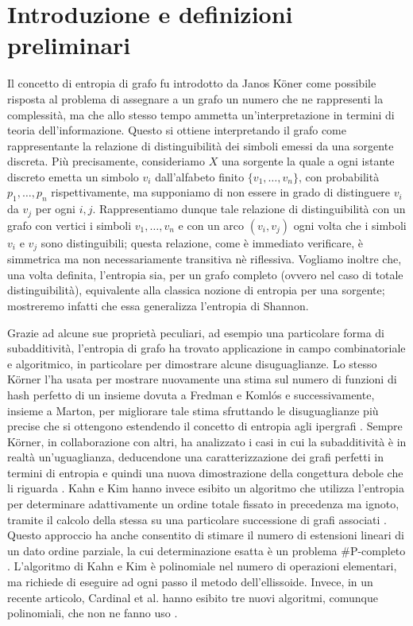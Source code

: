 \chapter{Introduzione e definizioni preliminari} 
Il concetto di entropia di grafo fu introdotto da Janos K\"oner come possibile risposta al problema di assegnare a un grafo un numero che ne rappresenti la complessità, ma che allo stesso tempo ammetta un'interpretazione in termini di teoria dell'informazione. \cite{Korner1973} Questo si ottiene interpretando il grafo come rappresentante la relazione di distinguibilità dei simboli emessi da una sorgente discreta. Più precisamente, consideriamo $X$ una sorgente la quale a ogni istante discreto emetta un simbolo $v_i$ dall'alfabeto finito $\{v_1,\dots,v_n\}$, con probabilità $p_1,\dots,p_n$ rispettivamente, ma supponiamo di non essere in grado di distinguere $v_i$ da $v_j$ per ogni $i,j$. Rappresentiamo dunque tale relazione di distinguibilità con un grafo con vertici i simboli $v_1,\dots,v_n$ e con un arco $(v_i,v_j)$ ogni volta che i simboli $v_i$ e $v_j$ sono distinguibili; questa relazione, come è immediato verificare, è simmetrica ma non necessariamente transitiva nè riflessiva. Vogliamo inoltre che, una volta definita, l'entropia sia, per un grafo completo (ovvero nel caso di totale distinguibilità), equivalente alla classica nozione di entropia per una sorgente; mostreremo infatti che essa generalizza l'entropia di Shannon.

Grazie ad alcune sue proprietà peculiari, ad esempio una particolare forma di subadditività, l'entropia di grafo ha trovato applicazione in campo combinatoriale e algoritmico, in particolare per dimostrare alcune disuguaglianze. Lo stesso K\"orner l'ha usata per mostrare nuovamente una stima sul numero di funzioni di hash perfetto di un insieme dovuta a Fredman e Koml\'os \cite{Korner1986} e successivamente, insieme a Marton, per migliorare tale stima sfruttando le disuguaglianze più precise che si ottengono estendendo il concetto di entropia agli ipergrafi \cite{Korner1990}. Sempre K\"orner, in collaborazione con altri, ha analizzato i casi in cui la subadditività è in realtà un'uguaglianza, deducendone una caratterizzazione dei grafi perfetti in termini di entropia e quindi una nuova dimostrazione della congettura debole che li riguarda \cite{Csiszar1990}. Kahn e Kim hanno invece esibito un algoritmo che utilizza l'entropia per determinare adattivamente un ordine totale fissato in precedenza ma ignoto, tramite il calcolo della stessa su una particolare successione di grafi associati \cite{Kahn1995}. Questo approccio ha anche consentito di stimare il numero di estensioni lineari di un dato ordine parziale, la cui determinazione esatta è un problema \#P-completo \cite{Brightwell1991}. L'algoritmo di Kahn e Kim \`e polinomiale nel numero di operazioni elementari, ma richiede di eseguire ad ogni passo il metodo dell'ellissoide. Invece, in un recente articolo, Cardinal et al. hanno esibito tre nuovi algoritmi, comunque polinomiali, che non ne fanno uso \cite{Cardinal2010}.

